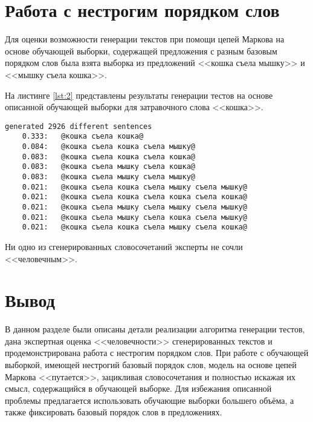 \section{Работа с нестрогим порядком слов}

Для оценки возможности генерации текстов при помощи цепей Маркова на основе обучающей выборки, содержащей предложения с разным базовым порядком слов была взята выборка из предложений <<кошка съела мышку>> и <<мышку съела кошка>>.

На листинге \ref{lst:2} представлены результаты генерации тестов на основе описанной обучающей выборки для затравочного слова <<кошка>>.

\begin{lstlisting}[label=lst:2,caption=Наиболее частые сгенерированные словосочетания и их частота]
	generated 2926 different sentences
	0.333:	 @кошка съела кошка@
	0.084:	 @кошка съела кошка съела мышку@
	0.083:	 @кошка съела кошка съела кошка@
	0.083:	 @кошка съела мышку съела кошка@
	0.083:	 @кошка съела мышку съела мышку@
	0.021:	 @кошка съела кошка съела мышку съела мышку@
	0.021:	 @кошка съела кошка съела кошка съела кошка@
	0.021:	 @кошка съела мышку съела мышку съела мышку@
	0.021:	 @кошка съела мышку съела кошка съела мышку@
	0.021:	 @кошка съела кошка съела мышку съела кошка@
\end{lstlisting}

Ни одно из сгенерированных словосочетаний эксперты не сочли <<человечным>>.



\section*{Вывод}

В данном разделе были описаны детали реализации алгоритма генерации тестов, дана экспертная оценка <<человечности>> сгенерированных текстов и продемонстрирована работа с нестрогим порядком слов. При работе с обучающей выборкой, имеющей нестрогий базовый порядок слов, модель на основе цепей Маркова <<путается>>, зацикливая словосочетания и полностью искажая их смысл, содержащийся в обучающей выборке. Для избежания описанной проблемы предлагается использовать обучающие выборки большего объёма, а также фиксировать базовый порядок слов в предложениях.

\clearpage
